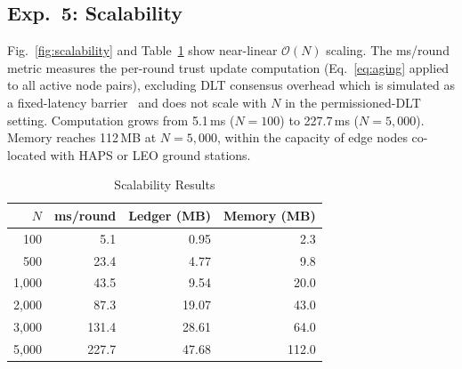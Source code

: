 \documentclass[journal,twoside,10pt]{IEEEtran}
\begin{document}
\subsection{Exp.~5: Scalability}

Fig.~\ref{fig:scalability} and Table~\ref{tab:scalability} show
near-linear $\mathcal{O}(N)$ scaling.
The ms/round metric measures the per-round trust update computation
(Eq.~\eqref{eq:aging} applied to all active node pairs), excluding
DLT consensus overhead which is simulated as a fixed-latency
barrier~\cite{yang2024} and does not scale with $N$ in the
permissioned-DLT setting.
Computation grows from 5.1\,ms ($N\!=\!100$) to 227.7\,ms
($N\!=\!5{,}000$).
Memory reaches 112\,MB at $N\!=\!5{,}000$, within the capacity of
edge nodes co-located with HAPS or LEO ground stations.

\begin{table}[t]
\centering
\caption{Scalability Results}
\label{tab:scalability}
\renewcommand{\arraystretch}{1.1}
\small
\begin{tabular}{rrrr}
\toprule
$N$ & \textbf{ms/round} & \textbf{Ledger (MB)} & \textbf{Memory (MB)} \\
\midrule
   100 &   5.1 &  0.95 &   2.3 \\
   500 &  23.4 &  4.77 &   9.8 \\
 1{,}000 & 43.5 &  9.54 &  20.0 \\
 2{,}000 & 87.3 & 19.07 &  43.0 \\
 3{,}000 &131.4 & 28.61 &  64.0 \\
 5{,}000 &227.7 & 47.68 & 112.0 \\
\bottomrule
\end{tabular}
\end{table}
\end{document}
